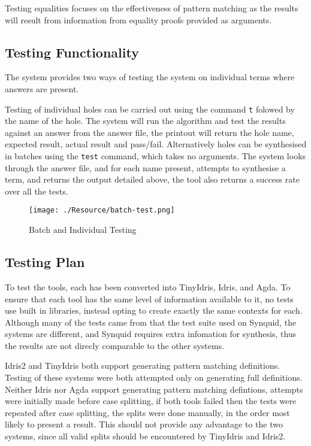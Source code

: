 \documentclass[a4paper]{article}
\begin{document}
Testing equalities focuses on the effectiveness of pattern matching
as the results will result from information from equality proofs provided
as arguments. 


\subsection{Testing Functionality}

The system provides two ways of testing the system on individual terms
where answers are present. 

Testing of individual holes can be carried out using the 
command \texttt{t} folowed by the name of the hole. The system
will run the algorithm and test the results against an answer from
the answer file, the printout will return the hole name, expected result,
actual result and pass/fail. Alternatively holes can be synthesised in 
batches using the \texttt{test} command, which takes no arguments.
The system looks through the answer file, and for each name present,
attempts to synthesise a term, and returns the output detailed above,
the tool also returns a success rate over all the tests. 

\begin{center}
\begin{figure}[htbp]
\centering
\texttt{[image: ./Resource/batch-test.png]}
\caption{Batch and Individual Testing}
\end{figure}
\end{center}


\subsection{Testing Plan}

To test the tools, each has been converted into TinyIdris,
Idris, and Agda. To ensure that each tool has the same level
of information available to it, no tests use built in libraries,
instead opting to create exactly the same contexts for each.
Although many of the tests came from that the test suite used on
Synquid, the systems are different, and Synquid requires extra
infomation for synthesis, thus the results are not direcly
comparable to the other systems.


Idris2 and TinyIdris both support generating
pattern matching definitions. Testing of these systems
were both attempted only on generating full definitions.
Neither Idris nor Agda support generating pattern matching
defintions, attempts were initially made before case splitting,
if both tools failed then the tests were repeated after
case splitting, the splits were done manually,
in the order most likely to present a result. This should not
provide any advantage to the two systems, since all valid splits
should be encountered by TinyIdris and Idris2.
\end{document}

